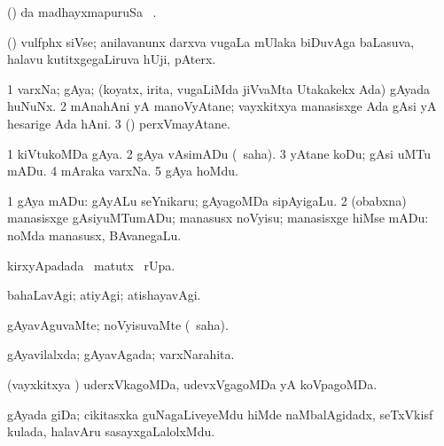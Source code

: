 \begin{center}
\bentry
{} 
\gl{\kirx}
\expl{}
\bmng
(\pArxparx)  \kirx da madhayxmapuruSa \Eva\ \BU. 
\emng
\eentry

\bentry
{} 
\gl{\nA}
\expl{}
\bmng
(\ravi) vulfphx siVse; anilavanunx darxva \mo vugaLa mUlaka biDuvAga baLasuva, halavu kutitxgegaLiruva hUji, pAterx. 
\emng
\eentry

\bentry
{} 
\gl{\nA}
\expl{}
\bmng
\bnum
\num{1} varxNa; gAya; (koyatx, irita, \mo vugaLiMda jiVvaMta Utakakekx Ada) gAyada huNuNx. 
\num{2} mAnahAni yA manoVyAtane; vayxkitxya manasisxge Ada gAsi yA hesarige Ada hAni. 
\num{3} (\kAparx) perxVmayAtane. 
\enum
\emng

\noindent
\gl{\pagu}
\expl{}
\bmng
\bnum
\num{1}  kiVtukoMDa gAya. 
\num{2}  gAya vAsimADu (\rUpa\ saha). 
\num{3}  yAtane koDu; gAsi uMTu mADu. 
\num{4}  mAraka varxNa. 
\num{5}  gAya hoMdu. 
\enum
\emng
\eentry

\bentry
{} 
\gl{\sakirx}
\expl{}
\bmng
\bnum
\num{1} gAya mADu:  gAyALu seYnikaru; gAyagoMDa sipAyigaLu. 
\num{2} (obabxna) manasisxge gAsiyuMTumADu; manasusx noVyisu; manasisxge hiMse mADu:  noMda manasusx, BAvanegaLu. 
\enum
\emng
\eentry

\bentry
{} 
\gl{\kirx}
\expl{}
\bmng
{} kirxyApadada \BU\ matutx \BUkaq\ rUpa. 
\emng
\eentry

\bentry
{} 
\gl{\kirxvi}
\expl{}
\bmng
bahaLavAgi; atiyAgi; atishayavAgi. 
\emng
\eentry

\bentry
{} 
\gl{\kirxvi}
\expl{}
\bmng
gAyavAguvaMte; noVyisuvaMte (\rUpa\ saha). 
\emng
\eentry

\bentry
{} 
\gl{\gu}
\expl{}
\bmng
gAyavilalxda; gAyavAgada; varxNarahita. 
\emng
\eentry

\bentry
{} 
\gl{\gu}
\expl{}
\bmng
(vayxkitxya \vi) uderxVkagoMDa, udevxVgagoMDa yA koVpagoMDa. 
\emng
\eentry

\bentry
{} 
\gl{\nA}
\expl{}
\bmng
gAyada giDa; cikitasxka guNagaLiveyeMdu hiMde naMbalAgidadx, seTxVkisf kulada, halavAru sasayxgaLalolxMdu. 
\emng
\eentry


\end{center}
